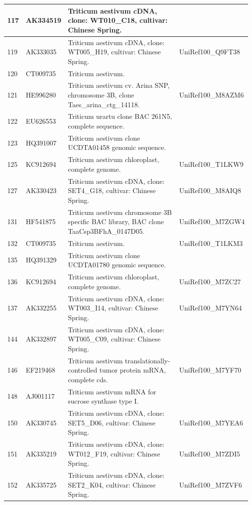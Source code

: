 \documentclass[10.9pt]{article} %
\begin{document}
{\begin{longtable}{|p{1.5cm}|p{2cm}|p{9cm}|p{3cm}|}
117 & AK334519 & Triticum aestivum cDNA, clone: WT010\_C18, cultivar: Chinese Spring. & \\
\hline
119 & AK333035 & Triticum aestivum cDNA, clone: WT005\_H19, cultivar: Chinese Spring. & UniRef100\_Q9FT38\\
\hline
120 & CT009735 & Triticum aestivum. & \\
\hline
121 & HE996280 & Triticum aestivum cv. Arina SNP, chromosome 3B, clone Taes\_arina\_ctg\_14118. & UniRef100\_M8AZM6\\
\hline
122 & EU626553 & Triticum urartu clone BAC 261N5, complete sequence. & \\
\hline
123 & HQ391007 & Triticum aestivum clone UCDTA01458 genomic sequence. & \\
\hline
125 & KC912694 & Triticum aestivum chloroplast, complete genome. & UniRef100\_T1LKW9\\
\hline
127 & AK330423 & Triticum aestivum cDNA, clone: SET4\_G18, cultivar: Chinese Spring. & UniRef100\_M8AIQ8\\
\hline
131 & HF541875 & Triticum aestivum chromosome 3B specific BAC library, BAC clone TaaCsp3BFhA\_0147D05. & UniRef100\_M7ZGW4\\
\hline
132 & CT009735 & Triticum aestivum. & UniRef100\_T1LKM3\\
\hline
135 & HQ391329 & Triticum aestivum clone UCDTA01780 genomic sequence. & \\
\hline
136 & KC912694 & Triticum aestivum chloroplast, complete genome. & UniRef100\_M7ZC27\\
\hline
137 & AK332255 & Triticum aestivum cDNA, clone: WT003\_I14, cultivar: Chinese Spring. & UniRef100\_M7YN64\\
\hline
144 & AK332897 & Triticum aestivum cDNA, clone: WT005\_C09, cultivar: Chinese Spring. & \\
\hline
146 & EF219468 & Triticum aestivum translationally-controlled tumor protein mRNA, complete cds. & UniRef100\_M7YF70\\
\hline
148 & AJ001117 & Triticum aestivum mRNA for sucrose synthase type I. & \\
\hline
150 & AK330745 & Triticum aestivum cDNA, clone: SET5\_D06, cultivar: Chinese Spring. & UniRef100\_M7YEA6\\
\hline
151 & AK335219 & Triticum aestivum cDNA, clone: WT012\_F19, cultivar: Chinese Spring. & UniRef100\_M7ZDI5\\
\hline
152 & AK335725 & Triticum aestivum cDNA, clone: SET2\_K04, cultivar: Chinese Spring. & UniRef100\_M7ZVF6\\

\end{longtable}}
\end{document}
